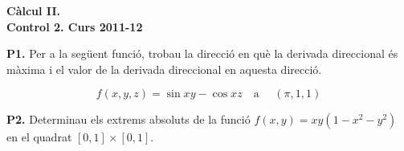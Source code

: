 \documentclass[12pt]{report}
\begin{document}
\begin{center}
\textbf{\Large Càlcul II.\\ Control 2. Curs 2011-12}
\end{center}

\vskip 0.3cm
\noindent
\textbf{P1.} Per a la següent funció, trobau la direcció en què la derivada direccional és màxima
i el valor de la derivada direccional en aquesta direcció.

\[
f(x, y, z)=\sin xy - \cos xz \quad \text{a } \quad (\pi, 1, 1)
\]

\vskip 0.3cm
\noindent
\textbf{P2.} Determinau els extrems absoluts de la funció $f(x, y)=xy(1-x^2-y^2)$ en el
quadrat $[0, 1] \times [0, 1]$.
\end{document}
